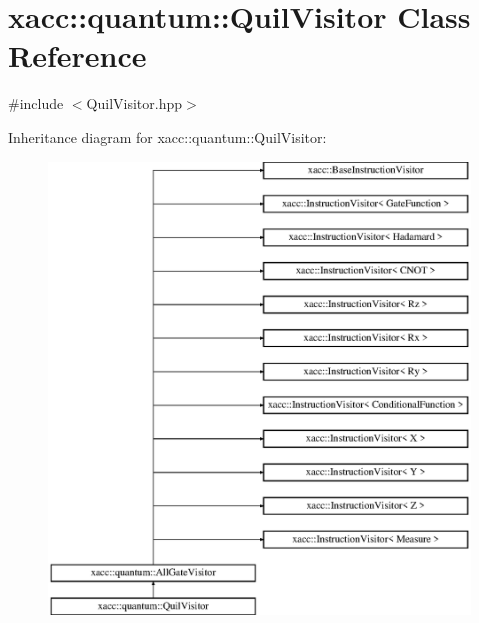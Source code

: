 \hypertarget{a00241}{}\section{xacc\+:\+:quantum\+:\+:Quil\+Visitor Class Reference}
\label{a00241}


{\ttfamily \#include $<$Quil\+Visitor.\+hpp$>$}

Inheritance diagram for xacc\+:\+:quantum\+:\+:Quil\+Visitor\+:\begin{figure}[H]
\begin{center}
\leavevmode
\includegraphics[height=12.000000cm]{a00241}
\end{center}
\end{figure}
